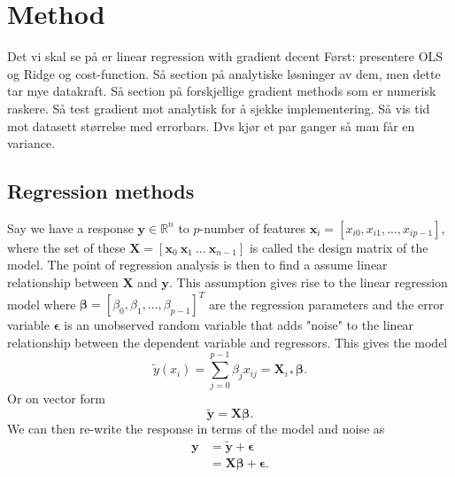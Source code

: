 \section{Method}
Det vi skal se på er linear regression with gradient decent
Først: presentere OLS og Ridge og cost-function. Så section på analytiske løsninger av dem, men dette tar mye datakraft. Så section på forskjellige gradient methods som er numerisk raskere. Så test gradient mot analytisk for å sjekke implementering. Så vis tid mot datasett størrelse med errorbars. Dvs kjør et par ganger så man får en variance.
\begin{comment}
	Describe the methods and algorithms. You need to
	explain how you implemented the methods and also
	say something about the structure of your algorithm
	and present some parts of your code. You should
	plug in some calculations to demonstrate your code,
	such as selected runs used to validate and verify your
	results. The latter is extremely important! A reader
	needs to understand that your code reproduces selected
	benchmarks and reproduces previous results, either
	numerical and/or well-known closed form expressions.
\end{comment}

\subsection{Regression methods}
Say we have a response $\mathbf{y}\in\mathbb{R}^n$ to $p$-number of features $\mathbf{x}_i=[x_{i0}, x_{i1},...,x_{ip-1}]$, where the set of these $\mathbf{X}=[\mathbf{x}_{0}\ \mathbf{x}_{1}\ ...\ \mathbf{x}_{n-1}]$ is called the design matrix of the model. 
The point of regression analysis is then to find a assume linear relationship between $\mathbf{X}$ and $\mathbf{y}$. This assumption gives rise to the linear regression model where $\boldsymbol\beta=\left[\beta_0, \beta_1, ..., \beta_{p-1} \right]^T$ are the regression parameters and the error variable $\boldsymbol\epsilon$ is an unobserved random variable that adds "noise" to the linear relationship between the dependent variable and regressors. This gives the model
\begin{equation*}
	\tilde{y}(x_i) = \sum_{j=0}^{p-1} \beta_j x_{ij}=\mathbf X_{i*}\boldsymbol{\beta}.
\end{equation*}
Or on vector form
\begin{equation*}
\boldsymbol{\tilde y} = \mathbf{X}\boldsymbol\beta.
\end{equation*}
We can then re-write the response in terms of the model and noise as
\begin{align*}
\label{eq:linear_regression}
    \mathbf{y} 
	&=\boldsymbol{\tilde y} + \boldsymbol{\epsilon}\\
	&=\mathbf{X}\boldsymbol{\beta} + \boldsymbol{\epsilon}.
\end{align*}




